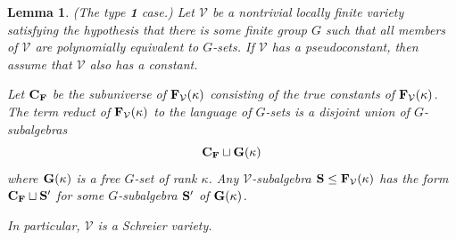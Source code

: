 \documentclass[12pt]{amsart}
\newtheorem{lm}[thm]{Lemma}
\theoremstyle{definition}
\numberwithin{equation}{section}
\newcommand{\m}[1]{{\mathbf{\uppercase{#1}}}}
\begin{document}
\begin{lm} \label{Gset_lm}
  \emph{(The type {\bf 1} case.)}
Let $\mathcal V$ be a nontrivial locally finite variety
satisfying the hypothesis that there is some
finite group $G$ such that all members of $\mathcal{V}$ are
polynomially equivalent to $G$-sets.
If $\mathcal V$ has a pseudoconstant, then
assume that $\mathcal V$ also has a
constant.

Let $\m C_{\m f}$ be the subuniverse of
$\m f_{\mathcal V}(\kappa)$ consisting of the true
constants of $\m f_{\mathcal{V}}(\kappa)$.
The term reduct of $\m f_{\mathcal V}(\kappa)$
to the language of $G$-sets 
is a disjoint union of $G$-subalgebras
\[\m c_{\m f}\sqcup \m g(\kappa)\]
where $\m g(\kappa)$ is a free $G$-set of rank $\kappa$.
Any $\mathcal V$-subalgebra 
$\m s\leq \m f_{\mathcal V}(\kappa)$ has the form
$\m c_{\m f}\sqcup {\m s}'$ for some
$G$-subalgebra ${\m s}'$ of $\m g(\kappa)$.

In particular, $\mathcal V$ is a Schreier variety.
\end{lm}  
\end{document}
